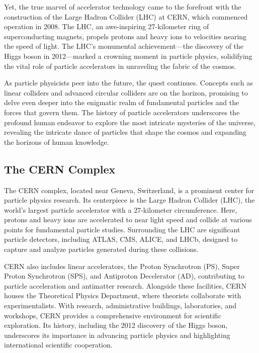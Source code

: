 Yet, the true marvel of accelerator technology came to the forefront with the construction of the Large Hadron Collider (LHC) at CERN, which commenced operation in 2008. The LHC, an awe-inspiring 27-kilometer ring of superconducting magnets, propels protons and heavy ions to velocities nearing the speed of light. The LHC's monumental achievement—the discovery of the Higgs boson in 2012—marked a crowning moment in particle physics, solidifying the vital role of particle accelerators in unraveling the fabric of the cosmos.

As particle physicists peer into the future, the quest continues. Concepts such as linear colliders and advanced circular colliders are on the horizon, promising to delve even deeper into the enigmatic realm of fundamental particles and the forces that govern them. The history of particle accelerators underscores the profound human endeavor to explore the most intricate mysteries of the universe, revealing the intricate dance of particles that shape the cosmos and expanding the horizons of human knowledge.



\subsection{The CERN Complex}


The CERN complex, located near Geneva, Switzerland, is a prominent center for particle physics research. Its centerpiece is the Large Hadron Collider (LHC), the world's largest particle accelerator with a 27-kilometer circumference. Here, protons and heavy ions are accelerated to near light speed and collide at various points for fundamental particle studies. Surrounding the LHC are significant particle detectors, including ATLAS, CMS, ALICE, and LHCb, designed to capture and analyze particles generated during these collisions.

CERN also includes linear accelerators, the Proton Synchrotron (PS), Super Proton Synchrotron (SPS), and Antiproton Decelerator (AD), contributing to particle acceleration and antimatter research. Alongside these facilities, CERN houses the Theoretical Physics Department, where theorists collaborate with experimentalists. With research, administrative buildings, laboratories, and workshops, CERN provides a comprehensive environment for scientific exploration. Its history, including the 2012 discovery of the Higgs boson, underscores its importance in advancing particle physics and highlighting international scientific cooperation.



